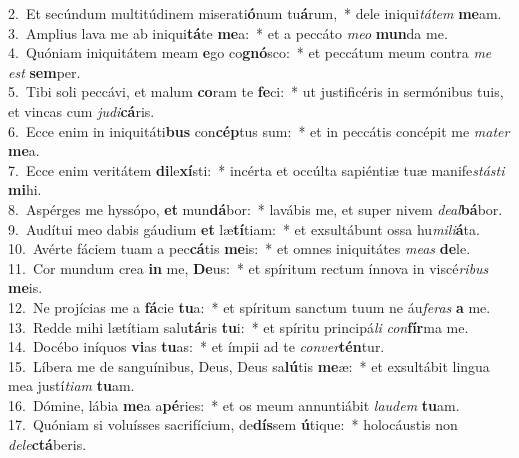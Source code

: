 {2.~}Et secúndum multitúdinem miserati\textbf{ó}num tu\textbf{á}rum,~* dele iniqui\textit{tá}\textit{tem} \textbf{me}am.\\
{3.~}Amplius lava me ab iniqui\textbf{tá}te \textbf{me}a:~* et a peccáto \textit{me}\textit{o} \textbf{mun}da me.\\
{4.~}Quóniam iniquitátem meam \textbf{e}go co\textbf{gnó}sco:~* et peccátum meum contra \textit{me} \textit{est} \textbf{sem}per.\\
{5.~}Tibi soli peccávi, et malum \textbf{co}ram te \textbf{fe}ci:~* ut justificéris in sermónibus tuis, et vincas cum \textit{ju}\textit{di}\textbf{cá}ris.\\
{6.~}Ecce enim in iniquitáti\textbf{bus} con\textbf{cép}tus sum:~* et in peccátis concépit me \textit{ma}\textit{ter} \textbf{me}a.\\
{7.~}Ecce enim veritátem \textbf{di}le\textbf{xí}sti:~* incérta et occúlta sapiéntiæ tuæ manife\textit{stá}\textit{sti} \textbf{mi}hi.\\
{8.~}Aspérges me hyssópo, \textbf{et} mun\textbf{dá}bor:~* lavábis me, et super nivem \textit{de}\textit{al}\textbf{bá}bor.\\
{9.~}Audítui meo dabis gáudium \textbf{et} læ\textbf{tí}tiam:~* et exsultábunt ossa hu\textit{mi}\textit{li}\textbf{á}ta.\\
{10.~}Avérte fáciem tuam a pec\textbf{cá}tis \textbf{me}is:~* et omnes iniquitátes \textit{me}\textit{as} \textbf{de}le.\\
{11.~}Cor mundum crea \textbf{in} me, \textbf{De}us:~* et spíritum rectum ínnova in viscé\textit{ri}\textit{bus} \textbf{me}is.\\
{12.~}Ne projícias me a \textbf{fá}cie \textbf{tu}a:~* et spíritum sanctum tuum ne áu\textit{fe}\textit{ras} \textbf{a} me.\\
{13.~}Redde mihi lætítiam salu\textbf{tá}ris \textbf{tu}i:~* et spíritu principá\textit{li} \textit{con}\textbf{fír}ma me.\\
{14.~}Docébo iníquos \textbf{vi}as \textbf{tu}as:~* et ímpii ad te \textit{con}\textit{ver}\textbf{tén}tur.\\
{15.~}Líbera me de sanguínibus, Deus, Deus sa\textbf{lú}tis \textbf{me}æ:~* et exsultábit lingua mea justí\textit{ti}\textit{am} \textbf{tu}am.\\
{16.~}Dómine, lábia \textbf{me}a a\textbf{pé}ries:~* et os meum annuntiábit \textit{lau}\textit{dem} \textbf{tu}am.\\
{17.~}Quóniam si voluísses sacrifícium, de\textbf{dís}sem \textbf{ú}tique:~* holocáustis non \textit{de}\textit{le}\textbf{ctá}beris.\\
